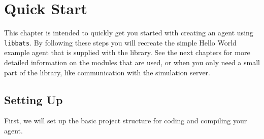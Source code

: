 \chapter{Quick Start}
\label{chQuickstart}

\lstset{numbers=left,numberstyle=\scriptsize}

This chapter is intended to quickly get you started with creating an
agent using {\tt libbats}. By following these steps you will recreate
the simple Hello World example agent that is supplied with the
library. See the next chapters for more detailed information on the
modules that are used, or when you only need a small part of the
library, like communication with the simulation server.

\section{Setting Up}
\label{sec:setting-up}

First, we will set up the basic project structure for coding and
compiling your agent.

